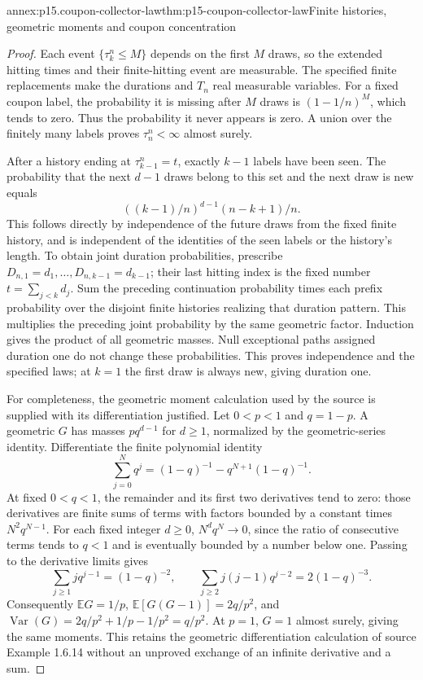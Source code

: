 \begin{annexitem}{annex:p15.coupon-collector-law}{thm:p15-coupon-collector-law}{Finite histories, geometric moments and coupon concentration}
\begin{proof}
Each event \(\{\tau_k^n\leq M\}\) depends on the first \(M\)
draws, so the extended hitting times and their finite-hitting event
are measurable. The specified finite replacements make the durations
and \(T_n\) real measurable variables.
For a fixed coupon label, the probability it is missing after \(M\)
draws is \((1-1/n)^M\), which tends to zero. Thus the probability
it never appears is zero. A union over the finitely many labels
proves \(\tau_n^n<\infty\) almost surely.

After a history ending at \(\tau_{k-1}^n=t\), exactly \(k-1\)
labels have been seen. The probability that the next \(d-1\) draws
belong to this set and the next draw is new equals
\[
 ((k-1)/n)^{d-1}(n-k+1)/n.
\]
This follows directly by independence of the future draws from the
fixed finite history, and is independent of the identities of the
seen labels or the history's length. To obtain joint duration
probabilities, prescribe \(D_{n,1}=d_1,\ldots,D_{n,k-1}=d_{k-1}\);
their last hitting index is the fixed number \(t=\sum_{j<k}d_j\).
Sum the preceding continuation probability times each prefix
probability over the disjoint finite histories realizing that duration
pattern. This multiplies the preceding joint probability by the same
geometric factor. Induction gives the product of all geometric masses.
Null exceptional paths assigned duration one do not change these
probabilities. This proves independence and the specified laws;
at \(k=1\) the first draw is always new, giving duration one.

For completeness, the geometric moment calculation used by the
source is supplied with its differentiation justified. Let \(0<p<1\)
and \(q=1-p\). A geometric \(G\) has masses \(pq^{d-1}\) for
\(d\geq1\), normalized by the geometric-series identity. Differentiate
the finite polynomial identity
\[
 \sum_{j=0}^Nq^j=(1-q)^{-1}-q^{N+1}(1-q)^{-1}.
\]
At fixed \(0<q<1\), the remainder and its first two derivatives tend
to zero: those derivatives are finite sums of terms with factors
bounded by a constant times \(N^2q^{N-1}\).
For each fixed integer \(d\geq0\), \(N^d q^N\to0\), since the
ratio of consecutive terms tends to \(q<1\) and is eventually
bounded by a number below one. Passing to the derivative limits gives
\[
 \sum_{j\geq1}j q^{j-1}=(1-q)^{-2},\qquad
 \sum_{j\geq2}j(j-1)q^{j-2}=2(1-q)^{-3}.
\]
Consequently
\(\mathbb EG=1/p\),
\(\mathbb E[G(G-1)]=2q/p^2\), and
\(\operatorname{Var}(G)=2q/p^2+1/p-1/p^2=q/p^2\).
At \(p=1\), \(G=1\) almost surely, giving the same moments.
This retains the geometric differentiation calculation of source
Example 1.6.14 \cite[p.~35]{DurrettPTEAuthor2019} without an
unproved exchange of an infinite derivative and a sum.


\end{proof}
\end{annexitem}
